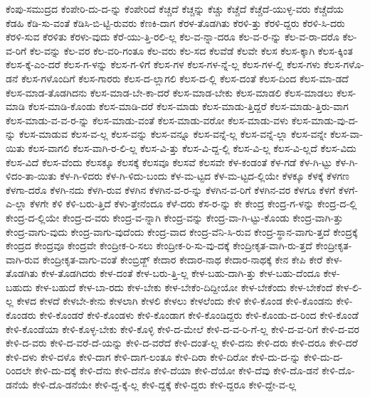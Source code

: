 {ಕೆಂಪು-ಸಮುದ್ರದ
ಕೆಂಪೇರಿ-ದು-ದ-ನ್ನು
ಕೆಂಪೇರಿದೆ
ಕೆಚ್ಚದೆ
ಕೆಚ್ಚನ್ನು
ಕೆಚ್ಚು
ಕೆಚ್ಚೆದೆ
ಕೆಚ್ಚೆದೆ-ಯುಳ್ಳ-ವರು
ಕೆಚ್ಚೆದೆಯ
ಕೆಡಹಿ
ಕೆಡಿ-ಸು-ವಂತೆ
ಕೆಡಿಸಿ-ಬಿ-ಟ್ಟಿ-ರುವರು
ಕೆಣಕಿ-ದಾಗ
ಕೆರಳ-ತೊಡಗಿತು
ಕೆರಳಿ-ತ್ತು
ಕೆರಳಿ-ದ್ದರು
ಕೆರಳಿ-ಸಿ-ದರು
ಕೆರಳಿ-ಸುವ
ಕೆರಳಿತು
ಕೆರಳು-ವುದು
ಕೆರೆ-ಯು-ತ್ತಿ-ರಲಿ-ಲ್ಲ
ಕೆಲ-ವ-ನ್ನಾ-ದರೂ
ಕೆಲ-ವ-ರ-ನ್ನು
ಕೆಲ-ವ-ರಾ-ದರೊ
ಕೆಲ-ವ-ರಿಗೆ
ಕೆಲ-ವನ್ನು
ಕೆಲ-ವರ
ಕೆಲ-ವರಿ-ಗಂತೂ
ಕೆಲ-ವರು
ಕೆಲ-ಸದ
ಕೆಲವೆಡೆ
ಕೆಲವೇ
ಕೆಲಸ
ಕೆಲಸ-ಕ್ಕಾಗಿ
ಕೆಲಸ-ಕ್ಕಿಂತ
ಕೆಲಸ-ಕ್ಕೆ-ಎಂ-ದರೆ
ಕೆಲಸ-ಗ-ಳನ್ನು
ಕೆಲಸ-ಗ-ಳಿಗೆ
ಕೆಲಸ-ಗಳ
ಕೆಲಸ-ಗಳ-ನ್ನೆ-ಲ್ಲ
ಕೆಲಸ-ಗಳ-ಲ್ಲಿ
ಕೆಲಸ-ಗಳು
ಕೆಲಸ-ಗಳೊ-ಡನೆ
ಕೆಲಸ-ಗಳೊಂದಿಗೆ
ಕೆಲಸ-ಗಾರರು
ಕೆಲಸ-ದ-ಲ್ಲಾಗಲಿ
ಕೆಲಸ-ದ-ಲ್ಲಿ
ಕೆಲಸ-ದಂತೆ
ಕೆಲಸ-ದಿಂದ
ಕೆಲಸ-ಮಾ-ಡದೆ
ಕೆಲಸ-ಮಾಡ-ತೊಡಗಿದನು
ಕೆಲಸ-ಮಾಡ-ಬೇ-ಕಾ-ದರೆ
ಕೆಲಸ-ಮಾಡ-ಬೇಕು
ಕೆಲಸ-ಮಾಡಲಿ
ಕೆಲಸ-ಮಾಡಲು
ಕೆಲಸ-ಮಾಡಿ
ಕೆಲಸ-ಮಾಡಿ-ಕೊಂಡು
ಕೆಲಸ-ಮಾಡಿ-ದರೆ
ಕೆಲಸ-ಮಾಡು
ಕೆಲಸ-ಮಾಡು-ತ್ತಿದ್ದರೆ
ಕೆಲಸ-ಮಾಡು-ತ್ತಿರು-ವಾಗ
ಕೆಲಸ-ಮಾಡು-ವ-ವ-ರ-ನ್ನು
ಕೆಲಸ-ಮಾಡು-ವಂತೆ
ಕೆಲಸ-ಮಾಡು-ವರೋ
ಕೆಲಸ-ಮಾಡು-ವಳು
ಕೆಲಸ-ಮಾಡು-ವು-ದ-ನ್ನು
ಕೆಲಸ-ಮಾಡುವ
ಕೆಲಸ-ವ-ಲ್ಲ
ಕೆಲಸ-ವನ್ನು
ಕೆಲಸ-ವನ್ನೂ
ಕೆಲಸ-ವನ್ನೆ-ಲ್ಲ
ಕೆಲಸ-ವನ್ನೆ-ಲ್ಲಾ
ಕೆಲಸ-ವನ್ನೇ
ಕೆಲಸ-ವಾ-ಯಿತು
ಕೆಲಸ-ವಾಗಲಿ
ಕೆಲಸ-ವಾಗಿ-ರ-ಲಿ-ಲ್ಲ
ಕೆಲಸ-ವಿ-ತ್ತು
ಕೆಲಸ-ವಿ-ದ್ದ-ಲ್ಲಿ
ಕೆಲಸ-ವಿ-ಲ್ಲ
ಕೆಲಸ-ವಿ-ಲ್ಲದೆ
ಕೆಲಸ-ವಿದು
ಕೆಲಸ-ವಿದೆ
ಕೆಲಸ-ವೆಂದು
ಕೆಲಸಕ್ಕೂ
ಕೆಲಸಕ್ಕೆ
ಕೆಲಸವೂ
ಕೆಲಸವೆ
ಕೆಲಸವೇ
ಕೆಳ-ಕಂಡಂತೆ
ಕೆಳ-ಗಡೆ
ಕೆಳ-ಗಿ-ಟ್ಟು
ಕೆಳ-ಗಿ-ಳಿದಂ-ತಾ-ಯಿತು
ಕೆಳ-ಗಿ-ಳಿದರು
ಕೆಳ-ಗಿ-ಳಿದು-ಬಂದು
ಕೆಳ-ಮ-ಟ್ಟದ
ಕೆಳ-ಮ-ಟ್ಟದ-ಲ್ಲಿಯೇ
ಕೆಳಕ್ಕೂ
ಕೆಳಕ್ಕೆ
ಕೆಳಗಣ
ಕೆಳಗಾ-ದರೊ
ಕೆಳಗಿ-ನದು
ಕೆಳಗಿ-ರುವ
ಕೆಳಗಿನ
ಕೆಳಗಿನ-ವ-ರ-ನ್ನು
ಕೆಳಗಿನ-ವ-ರಿಗೆ
ಕೆಳಗಿನ-ವರ
ಕೆಳಗೂ
ಕೆಳಗೆ
ಕೆಳಗೆ-ಎ-ಲ್ಲಾ
ಕೆಳಗೇ
ಕೆಳಿ
ಕೆಳಿ-ಬರು-ತ್ತಿದೆ
ಕೆಳು-ತ್ತೇನೆಂದೂ
ಕೆಳೆ-ದರು
ಕೆಸ-ರ-ನ್ನು
ಕೇ
ಕೇಂದ್ರ
ಕೇಂದ್ರ-ಗ-ಳನ್ನು
ಕೇಂದ್ರ-ದ-ಲ್ಲಿ
ಕೇಂದ್ರ-ದ-ಲ್ಲಿಯೇ
ಕೇಂದ್ರ-ದ-ವರು
ಕೇಂದ್ರ-ವ-ನ್ನಾಗಿ
ಕೇಂದ್ರ-ವನ್ನು
ಕೇಂದ್ರ-ವಾ-ಗಿ-ಟ್ಟು-ಕೊಂಡು
ಕೇಂದ್ರ-ವಾಗಿ-ತ್ತು
ಕೇಂದ್ರ-ವಾಗು-ವುದು
ಕೇಂದ್ರ-ವಾಗು-ವುದೆಂದು
ಕೇಂದ್ರ-ವಾದ
ಕೇಂದ್ರ-ವೆನಿ-ಸಿ-ರುವ
ಕೇಂದ್ರ-ಸ್ಥಾನ-ವಾಗು-ತ್ತದೆ
ಕೇಂದ್ರಕ್ಕೆ
ಕೇಂದ್ರದ
ಕೇಂದ್ರವೂ
ಕೇಂದ್ರವೇ
ಕೇಂದ್ರೀಕ-ರಿ-ಸಲು
ಕೇಂದ್ರೀಕ-ರಿ-ಸು-ವು-ದಕ್ಕೆ
ಕೇಂದ್ರೀಕೃತ-ವಾಗಿ-ರು-ತ್ತದೆ
ಕೇಂದ್ರೀಕೃತ-ವಾಗಿ-ರುವ
ಕೇಂದ್ರೀಕೃತ-ವಾಗು-ವಂತೆ
ಕೇಂಬ್ರಿಡ್ಜ್
ಕೇದಾರ
ಕೇದಾರ-ನಾಥ
ಕೇದಾರ-ನಾಥಕ್ಕೆ
ಕೇನ
ಕೇಪಿ
ಕೇರೆ
ಕೇಳ-ತೊಡಗಿತು
ಕೇಳ-ತೊಡಗಿದರು
ಕೇಳ-ದಂತೆ
ಕೇಳ-ಬರು-ತ್ತಿ-ಲ್ಲ
ಕೇಳ-ಬಹು-ದಾಗಿ-ತ್ತು
ಕೇಳ-ಬಹು-ದೆಂದೂ
ಕೇಳ-ಬಹುದು
ಕೇಳ-ಬಹುದೆ
ಕೇಳ-ಬಾ-ರದು
ಕೇಳ-ಬೇಕು
ಕೇಳ-ಬೇಕೆಂ-ದಿದ್ದೀಯೋ
ಕೇಳ-ಬೇಕೆಂದು
ಕೇಳ-ಬೇಕೆಂದೆ
ಕೇಳ-ಲಿ-ಲ್ಲ
ಕೇಳದ
ಕೇಳದೆ
ಕೇಳಬೇ-ಕೇನು
ಕೇಳಲಾಗಿ
ಕೇಳಲಿ
ಕೇಳಲು
ಕೇಳಲೆಂದು
ಕೇಳಿ
ಕೇಳಿ-ಕೊಂಡ
ಕೇಳಿ-ಕೊಂಡನು
ಕೇಳಿ-ಕೊಂಡರು
ಕೇಳಿ-ಕೊಂಡರೆ
ಕೇಳಿ-ಕೊಂಡಳು
ಕೇಳಿ-ಕೊಂಡಾಗ
ಕೇಳಿ-ಕೊಂಡಿದ್ದರು
ಕೇಳಿ-ಕೊಂಡು-ದ-ರಿಂದ
ಕೇಳಿ-ಕೊಂಡೆ
ಕೇಳಿ-ಕೊಂಡೆಯಾ
ಕೇಳಿ-ಕೊಳ್ಳ-ಬೇಕು
ಕೇಳಿ-ಕೊಳ್ಳಿ
ಕೇಳಿ-ದ-ಮೇಲೆ
ಕೇಳಿ-ದ-ವ-ರಿ-ಗೆ-ಲ್ಲ
ಕೇಳಿ-ದ-ವ-ರಿಗೆ
ಕೇಳಿ-ದ-ವರ
ಕೇಳಿ-ದ-ವರು
ಕೇಳಿ-ದ-ವರೆ-ದೆ-ಯನ್ನು
ಕೇಳಿ-ದ-ವರೆದೆ
ಕೇಳಿ-ದಂತೆ-ಲ್ಲ
ಕೇಳಿ-ದನು
ಕೇಳಿ-ದರು
ಕೇಳಿ-ದರೂ
ಕೇಳಿ-ದರೆ
ಕೇಳಿ-ದಳು
ಕೇಳಿ-ದಳೊ
ಕೇಳಿ-ದಾಗ
ಕೇಳಿ-ದಾಗ-ಲಂತೂ
ಕೇಳಿ-ದಿರಾ
ಕೇಳಿ-ದಿರೋ
ಕೇಳಿ-ದು-ದ-ನ್ನು
ಕೇಳಿ-ದು-ದ-ರಿಂದಲೇ
ಕೇಳಿ-ದು-ದಕ್ಕೆ
ಕೇಳಿ-ದೆನು
ಕೇಳಿ-ದೆನೊ
ಕೇಳಿ-ದೆಯಾ
ಕೇಳಿ-ದೆಯೋ
ಕೇಳಿ-ದೆವು
ಕೇಳಿ-ದೊ-ಡನೆ
ಕೇಳಿ-ದೊ-ಡನೆಯೆ
ಕೇಳಿ-ದೊ-ಡನೆಯೇ
ಕೇಳಿ-ದ್ದ-ಕ್ಕೆ-ಲ್ಲ
ಕೇಳಿ-ದ್ದಕ್ಕೆ
ಕೇಳಿ-ದ್ದರು
ಕೇಳಿ-ದ್ದರೂ
ಕೇಳಿ-ದ್ದೇ-ವ-ಲ್ಲ
}
